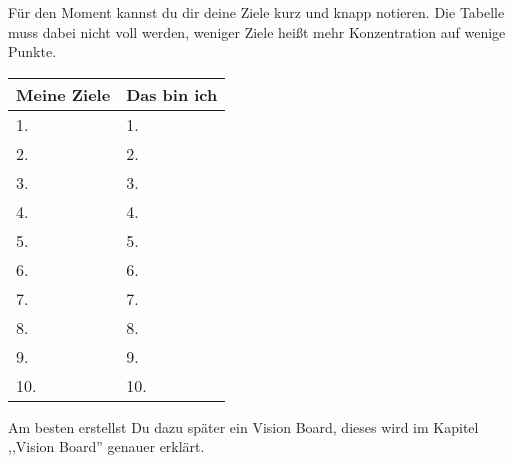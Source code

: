 \documentclass[../Lebensziel.tex]{subfiles}
\begin{document}
Für den Moment kannst du dir deine Ziele kurz und knapp notieren. Die Tabelle muss dabei nicht voll werden, weniger Ziele heißt mehr Konzentration auf wenige Punkte.

\begin{table}[h!]
    \centering
    \setlength{\tabcolsep}{18pt}
    \renewcommand{\arraystretch}{1.5}
    \begin{tabular}{p{5.5cm}|p{5.5cm}}
        \textbf{Meine Ziele} & \textbf{Das bin ich} \\\hline
        1.                   & 1.                   \\\hline
        2.                   & 2.                   \\\hline
        3.                   & 3.                   \\\hline
        4.                   & 4.                   \\\hline
        5.                   & 5.                   \\\hline
        6.                   & 6.                   \\\hline
        7.                   & 7.                   \\\hline
        8.                   & 8.                   \\\hline
        9.                   & 9.                   \\\hline
        10.                  & 10.
    \end{tabular}
    \label{kleines Lebensziel}
\end{table}

Am besten erstellst Du dazu später ein Vision Board, dieses wird im Kapitel ,,Vision Board'' genauer erklärt.
\end{document}
